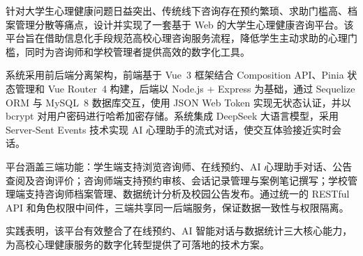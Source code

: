 \makecntitle
\abstract
{
针对大学生心理健康问题日益突出、传统线下咨询存在预约繁琐、求助门槛高、档案管理分散等痛点，设计并实现了一套基于 Web 的大学生心理健康咨询平台。该平台旨在借助信息化手段规范高校心理咨询服务流程，降低学生主动求助的心理门槛，同时为咨询师和学校管理者提供高效的数字化工具。

系统采用前后端分离架构，前端基于 Vue~3 框架结合 Composition API、Pinia 状态管理和 Vue Router~4 构建，后端以 Node.js + Express 为基础，通过 Sequelize ORM 与 MySQL~8 数据库交互，使用 JSON Web Token 实现无状态认证，并以 bcrypt 对用户密码进行哈希加密存储。系统集成 DeepSeek 大语言模型，采用 Server-Sent Events 技术实现 AI 心理助手的流式对话，使交互体验接近实时会话。

平台涵盖三端功能：学生端支持浏览咨询师、在线预约、AI 心理助手对话、公告查阅及咨询评价；咨询师端支持预约审核、会话记录管理与案例笔记撰写；学校管理端支持咨询师档案管理、数据统计分析及校园公告发布。通过统一的 RESTful API 和角色权限中间件，三端共享同一后端服务，保证数据一致性与权限隔离。

实践表明，该平台有效整合了在线预约、AI 智能对话与数据统计三大核心能力，为高校心理健康服务的数字化转型提供了可落地的技术方案。
}


\makeentitle

